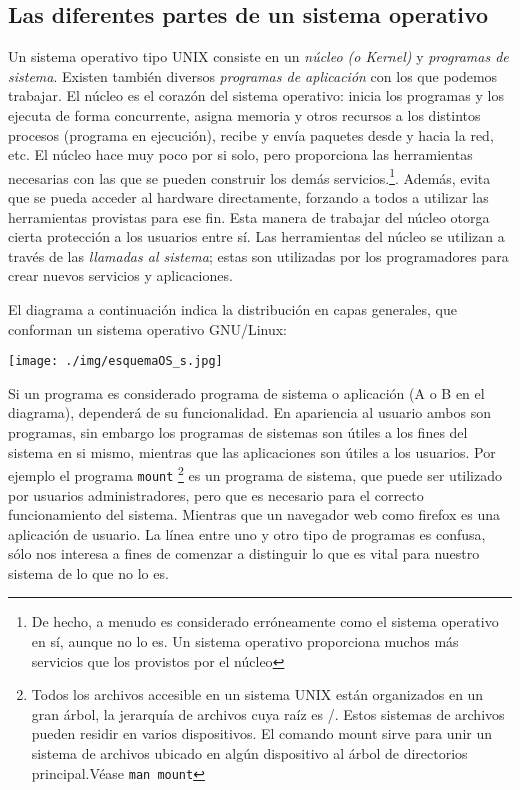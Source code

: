 \documentclass[12pt]{article}
\begin{document}
\subsection{Las diferentes partes de un sistema operativo}

Un sistema operativo tipo UNIX consiste en un \textit{núcleo (o Kernel)} 
y \textit{programas de sistema}. Existen también diversos 
\textit{programas de aplicación} con los que podemos trabajar.  El núcleo 
es el corazón del sistema operativo: inicia los programas y los ejecuta 
de forma concurrente, asigna memoria y otros recursos a los distintos 
procesos (programa en ejecución), recibe y envía paquetes desde y hacia 
la red, etc. El núcleo hace muy poco por si solo, pero proporciona las 
herramientas necesarias 
con las que se pueden construir los demás servicios.\footnote{De hecho, a 
menudo es considerado erróneamente como el sistema operativo en sí, 
aunque no lo es. Un sistema operativo proporciona muchos más
servicios que los provistos por el núcleo}.  
Además, evita que se pueda acceder al hardware directamente, forzando 
a todos a utilizar las herramientas provistas para ese fin. Esta
manera de trabajar del núcleo otorga cierta protección a los usuarios 
entre sí. Las herramientas del núcleo se utilizan a través de las 
\textit{llamadas al sistema}; estas son utilizadas por los programadores 
para crear nuevos servicios y aplicaciones.  

El diagrama a continuación indica la distribución en capas generales, 
que conforman un sistema operativo GNU/Linux: 

\begin{center}
\texttt{[image: ./img/esquemaOS\_s.jpg]}
\end{center}

Si un programa es considerado programa de sistema o aplicación 
(A o B en el diagrama), dependerá de su funcionalidad. En apariencia al 
usuario ambos son programas, sin embargo los programas de sistemas son 
útiles a los fines del sistema en si mismo, mientras que las aplicaciones
son útiles a los usuarios. Por ejemplo el programa \texttt{mount} 
\footnote{ Todos los archivos accesible en un sistema UNIX están 
organizados en 
un gran árbol, la jerarquía de archivos cuya raíz es /. Estos 
sistemas de archivos pueden residir en varios dispositivos. El 
comando mount sirve para unir un sistema de archivos ubicado en algún 
dispositivo al árbol de directorios principal.Véase \texttt{man mount}}
es un programa de sistema, que puede ser 
utilizado por usuarios administradores, pero que es necesario para el
correcto funcionamiento del sistema. Mientras que un navegador web como 
firefox es una aplicación de usuario. La línea entre uno y otro tipo de 
programas es confusa, sólo nos interesa a fines de comenzar a distinguir
lo que es vital para nuestro sistema de lo que no lo es.  
\end{document}

